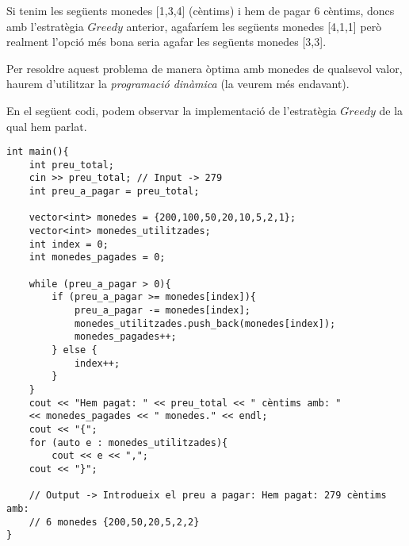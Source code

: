Si tenim les següents monedes [1,3,4] (cèntims) i hem de pagar 6 cèntims, doncs amb l'estratègia $Greedy$ anterior, agafaríem les següents monedes [4,1,1] però realment l'opció més bona seria agafar les següents monedes [3,3].

Per resoldre aquest problema de manera òptima amb monedes de qualsevol valor, haurem d'utilitzar la \emph{programació dinàmica} (la veurem més endavant). \newpage

En el següent codi, podem observar la implementació de l'estratègia $Greedy$ de la qual hem parlat.
\newline

\begin{lstlisting}
int main(){
    int preu_total;
    cin >> preu_total; // Input -> 279
    int preu_a_pagar = preu_total;
    
    vector<int> monedes = {200,100,50,20,10,5,2,1};
    vector<int> monedes_utilitzades;
    int index = 0;
    int monedes_pagades = 0;
    
    while (preu_a_pagar > 0){
        if (preu_a_pagar >= monedes[index]){
            preu_a_pagar -= monedes[index];
            monedes_utilitzades.push_back(monedes[index]);
            monedes_pagades++;
        } else {
            index++;
        }
    }
    cout << "Hem pagat: " << preu_total << " cèntims amb: "
    << monedes_pagades << " monedes." << endl;
    cout << "{";
    for (auto e : monedes_utilitzades){
        cout << e << ",";
    cout << "}";
    
    // Output -> Introdueix el preu a pagar: Hem pagat: 279 cèntims amb:
    // 6 monedes {200,50,20,5,2,2}
}

\end{lstlisting}